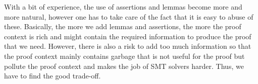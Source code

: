 With a bit of experience, the use of assertions and lemmas become more and more
natural, however one has to take care of the fact that it is easy to abuse of
these. Basically, the more we add lemmas and assertions, the more the proof
context is rich and might contain the required information to produce the proof
that we need. However, there is also a risk to add too much information so that
the proof context mainly contains garbage that is not useful for the proof but
pollute the proof context and makes the job of SMT solvers harder. Thus, we have
to find the good trade-off.


